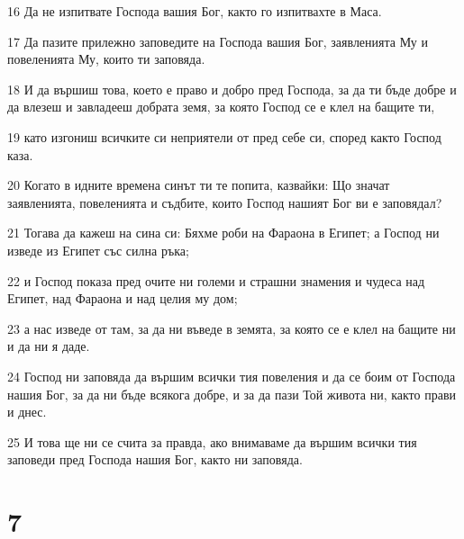 \par 16 Да не изпитвате Господа вашия Бог, както го изпитвахте в Маса.
\par 17 Да пазите прилежно заповедите на Господа вашия Бог, заявленията Му и повеленията Му, които ти заповяда.
\par 18 И да вършиш това, което е право и добро пред Господа, за да ти бъде добре и да влезеш и завладееш добрата земя, за която Господ се е клел на бащите ти,
\par 19 като изгониш всичките си неприятели от пред себе си, според както Господ каза.
\par 20 Когато в идните времена синът ти те попита, казвайки: Що значат заявленията, повеленията и съдбите, които Господ нашият Бог ви е заповядал?
\par 21 Тогава да кажеш на сина си: Бяхме роби на Фараона в Египет; а Господ ни изведе из Египет със силна ръка;
\par 22 и Господ показа пред очите ни големи и страшни знамения и чудеса над Египет, над Фараона и над целия му дом;
\par 23 а нас изведе от там, за да ни въведе в земята, за която се е клел на бащите ни и да ни я даде.
\par 24 Господ ни заповяда да вършим всички тия повеления и да се боим от Господа нашия Бог, за да ни бъде всякога добре, и за да пази Той живота ни, както прави и днес.
\par 25 И това ще ни се счита за правда, ако внимаваме да вършим всички тия заповеди пред Господа нашия Бог, както ни заповяда.

\chapter{7}

